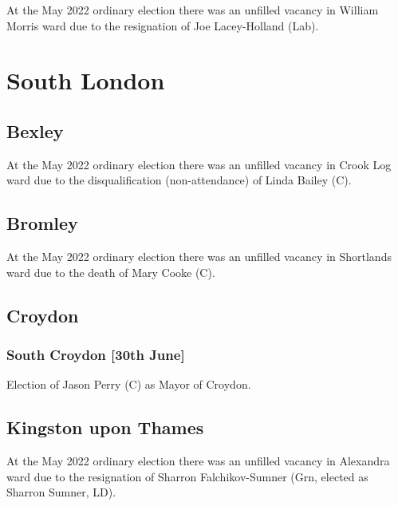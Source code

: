 \documentclass[a4paper,openany]{book}
\begin{document}
\begin{resultsiii}
At the May 2022 ordinary election there was an unfilled vacancy in William Morris ward due to the resignation of Joe Lacey-Holland (Lab).%

\section{South London}

\subsection*{Bexley}

At the May 2022 ordinary election there was an unfilled vacancy in Crook Log ward due to the disqualification (non-attendance) of Linda Bailey (C).%

\subsection*{Bromley}

At the May 2022 ordinary election there was an unfilled vacancy in Shortlands ward due to the death of Mary Cooke (C).%

\subsection*{Croydon}

\subsubsection*{South Croydon \hspace*{\fill}\nolinebreak[1]%
	\enspace\hspace*{\fill}
	[30th June]}


Election of Jason Perry (C) as Mayor of Croydon.

\subsection*{Kingston upon Thames}

At the May 2022 ordinary election there was an unfilled vacancy in Alexandra ward due to the resignation of Sharron Falchikov-Sumner (Grn, elected as Sharron Sumner, LD).%


\end{resultsiii}
\end{document}
